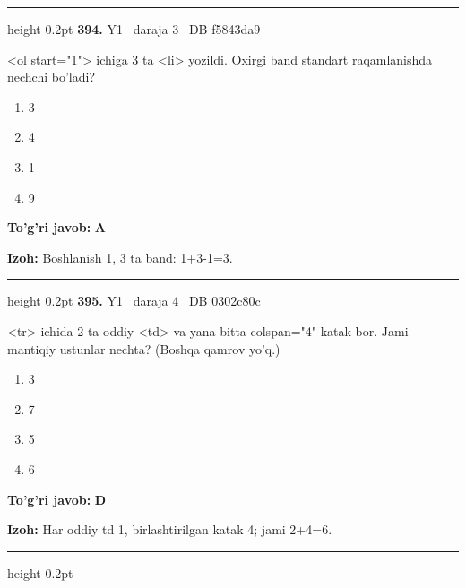 \documentclass[10pt,a4paper,oneside]{article}
\begin{document}
\vspace{2mm}\hrule height 0.2pt \vspace{4mm}
\hypertarget{q394}{\textbf{\color{ink}394.}}  {\color{muted}\scriptsize Y1 \textbullet\ daraja 3 \textbullet\ DB f5843da9}
\par
\textless{}ol start="1"\textgreater{} ichiga 3 ta \textless{}li\textgreater{} yozildi. Oxirgi band standart raqamlanishda nechchi bo'ladi?
\begin{enumerate}[label=\Alph*),leftmargin=9mm]
\item 3
\item 4
\item 1
\item 9
\end{enumerate}
\begin{tcolorbox}[enhanced,breakable,colback=teal!4,colframe=teal!45!black,boxrule=0.45pt,arc=1.2mm,left=2.8mm,right=2.8mm,top=2mm,bottom=2mm,before skip=2mm,after skip=2mm]
\textbf{\color{teal}To'g'ri javob:} \textbf{A}
\par\smallskip
\textbf{Izoh:} Boshlanish 1, 3 ta band: 1+3-1=3.
\end{tcolorbox}
\vspace{2mm}\hrule height 0.2pt \vspace{4mm}
\hypertarget{q395}{\textbf{\color{ink}395.}}  {\color{muted}\scriptsize Y1 \textbullet\ daraja 4 \textbullet\ DB 0302c80c}
\par
\textless{}tr\textgreater{} ichida 2 ta oddiy \textless{}td\textgreater{} va yana bitta colspan="4" katak bor. Jami mantiqiy ustunlar nechta? (Boshqa qamrov yo'q.)
\begin{enumerate}[label=\Alph*),leftmargin=9mm]
\item 3
\item 7
\item 5
\item 6
\end{enumerate}
\begin{tcolorbox}[enhanced,breakable,colback=teal!4,colframe=teal!45!black,boxrule=0.45pt,arc=1.2mm,left=2.8mm,right=2.8mm,top=2mm,bottom=2mm,before skip=2mm,after skip=2mm]
\textbf{\color{teal}To'g'ri javob:} \textbf{D}
\par\smallskip
\textbf{Izoh:} Har oddiy td 1, birlashtirilgan katak 4; jami 2+4=6.
\end{tcolorbox}
\vspace{2mm}\hrule height 0.2pt \vspace{4mm}
\end{document}
